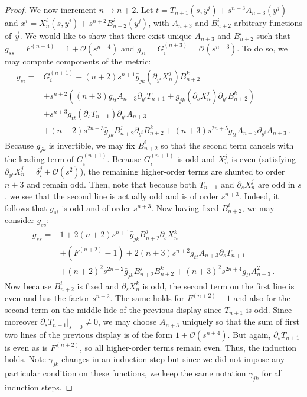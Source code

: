 \documentclass[10pt,a4paper]{amsart}
\begin{document}
\begin{proof}
We now increment $n \rightarrow n+2$. Let $t = T_{n+1}(s,y^j) + s^{n+3} A_{n+3}(y^j)$ and $x^i = X^i_{n}(s,y^j) + s^{n+2} B^i_{n+2}(y^j)$, with $A_{n+3}$ and $B^i_{n+2}$ arbitrary functions of $\vec{y}$. We would like to show that there exist unique $A_{n+3}$ and $B^i_{n+2}$ such that 
$g_{ss} = F^{(n+4)} = 1 + \mathcal{O}(s^{n+4})$ and $g_{si} = G^{(n+3)}_i = \mathcal{O}(s^{n+3})$. 
To do so, we may compute components of the metric:
\begin{align*}
g_{si} =& G^{(n+1)}_i +  (n+2)  s^{n+1} \bar{g}_{jk} (\partial_{y^i} X_n^j) B^k_{n+2} \\
&+ s^{n+2} \left((n+3) g_{tt} A_{n+3} \partial_{y^i} T_{n+1} + \bar{g}_{jk} (\partial_s X^j_n)\partial_{y^i} B^k_{n+2} \right) \\
&+ s^{n+3} g_{tt} (\partial_s T_{n+1}) \partial_{y^i} A_{n+3} \\
&+ (n+2) s^{2n+3} \bar{g}_{jk} B^j_{n+2} \partial_{y^i} B^k_{n+2} + (n+3) s^{2n+5} g_{tt} A_{n+3}  \partial_{y^i} A_{n+3} \,.
\end{align*}
Because $\bar{g}_{jk}$ is invertible, we may fix $B^i_{n+2}$ so that the second term cancels with the leading term of $G^{(n+1)}_i$. Because $G^{(n+1)}_i$ is odd and $X^j_n$ is even (satisfying $\partial_{y^i} X^j_n = \delta_i^j + \mathcal{O}(s^2)$), the remaining higher-order terms are shunted to order $n+3$ and remain odd. Then, note that because both $T_{n+1}$ and $\partial_s X^j_n$ are odd in $s$, we see that the second line is actually odd and is of order $s^{n+3}$. Indeed, it follows that $g_{si}$ is odd and of order $s^{n+3}$. Now having fixed $B^i_{n+2}$, we may consider $g_{ss}$:
\begin{align*}
g_{ss} =& 1 + 2(n+2) s^{n+1} \bar{g}_{jk} B^j_{n+2} \partial_s X^k_n \\
&+ (F^{(n+2)} - 1)  + 2(n+3) s^{n+2} g_{tt} A_{n+3} \partial_s T_{n+1} \\
&+ (n+2)^2 s^{2n+2} \bar{g}_{jk} B^j_{n+2} B^k_{n+2} + (n+3)^2 s^{2n+4} g_{tt} A_{n+3}^2 \,.
\end{align*}
Now because $B^i_{n+2}$ is fixed and $\partial_s X^k_n$ is odd, the second term on the first line is 
even and has the factor $s^{n+2}$. The same holds for $F^{(n+2)} - 1$ and also for the second
term on the middle lide of the previous display since $T_{n+1}$ is odd. Since moreover $\partial_s T_{n+1}|_{s = 0} \neq 0$, 
we may choose $A_{n+3}$ uniquely so that the sum of first two lines of the previous display is of the form
$1 + \mathcal{O}(s^{n+4})$. 
But again, $\partial_s T_{n+1}$ is even as is $F^{(n+2)}$, so all higher-order terms remain even. Thus, the induction holds. 
Note $\gamma_{jk}$ changes in an induction step but since we did not impose any particular condition
on these functions, we keep the same notation $\gamma_{jk}$ for all induction steps.



\end{proof}
\end{document}
